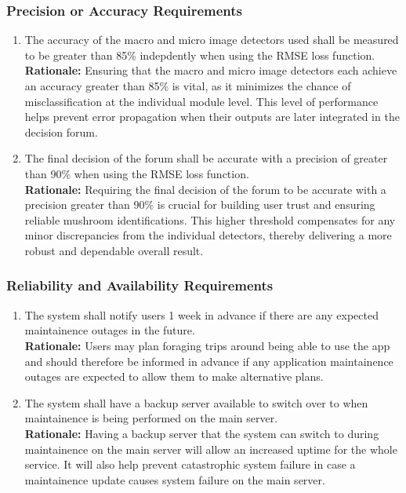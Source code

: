 \documentclass[]{article}
\begin{document}
\subsubsection{Precision or Accuracy Requirements}
\label{ssub:precision_or_accuracy_requirements}
\begin{enumerate}[{PR-PA}1. ]
	\item The accuracy of the macro and micro image detectors used shall be measured to be greater than 85\% indepdently when using the RMSE loss function.\\
	\textbf{Rationale:} Ensuring that the macro and micro image detectors each achieve an accuracy greater than 85\% is vital, as it minimizes the chance of misclassification at the individual module level. This level of performance helps prevent error propagation when their outputs are later integrated in the decision forum.
	\item The final decision of the forum shall be accurate with a precision of greater than 90\% when using the RMSE loss function.\\
	\textbf{Rationale:} Requiring the final decision of the forum to be accurate with a precision greater than 90\% is crucial for building user trust and ensuring reliable mushroom identifications. This higher threshold compensates for any minor discrepancies from the individual detectors, thereby delivering a more robust and dependable overall result.
\end{enumerate}

\subsubsection{Reliability and Availability Requirements}
\label{ssub:reliability_and_availability_requirements}
\begin{enumerate}[{PR-RA}1. ]
	\item The system shall notify users 1 week in advance if there are any expected maintainence outages in the future.\\
	\textbf{Rationale:} Users may plan foraging trips around being able to use the app and should therefore be informed in advance if any application maintainence outages are expected to allow them to make alternative plans. 
	\item The system shall have a backup server available to switch over to when maintainence is being performed on the main server.\\
	\textbf{Rationale:} Having a backup server that the system can switch to during maintainence on the main server will allow an increased uptime for the whole service. It will also help prevent catastrophic system failure 
	in case a maintainence update causes system failure on the main server.
\end{enumerate}
\end{document}

